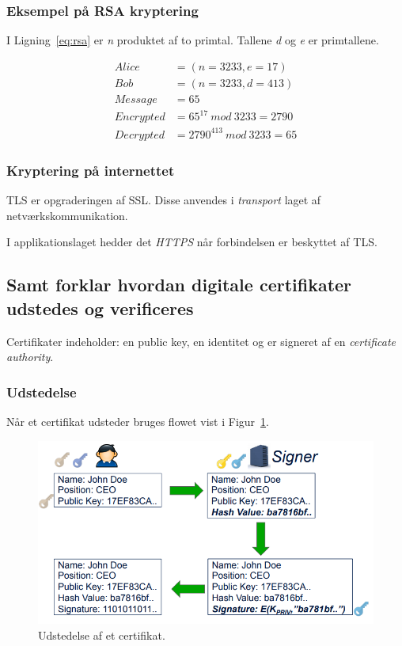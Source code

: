 \subsubsection{Eksempel på RSA kryptering}
I Ligning~\ref{eq:rsa} er \textit{n} produktet af to primtal. Tallene \textit{d} og \textit{e} er primtallene.

\begin{align}\label{eq:rsa}
	Alice &= (n = 3233, e = 17)\\
	Bob &= (n = 3233, d = 413)\\
	Message &= 65\\
	Encrypted &= 65^{17}~mod~3233 = 2790\\
	Decrypted &= 2790^{413}~mod~3233 = 65
\end{align}

\subsubsection{Kryptering på internettet}
TLS er opgraderingen af SSL. Disse anvendes i \textit{transport} laget af netværkskommunikation. 

I applikationslaget hedder det \textit{HTTPS} når forbindelsen er beskyttet af TLS.

\subsection{Samt forklar hvordan digitale certifikater udstedes og verificeres}
Certifikater indeholder: en public key, en identitet og er signeret af en \textit{certificate authority}.

\subsubsection{Udstedelse}
Når et certifikat udsteder bruges flowet vist i Figur~\ref{fig:cert-issue}.

\begin{figure}[H]
	\centering
	\includegraphics[width=0.75\linewidth]{figs/spm4/cert-issue}
	\caption{Udstedelse af et certifikat.}
	\label{fig:cert-issue}
\end{figure}

